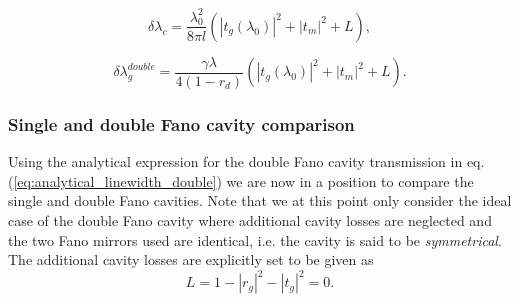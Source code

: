 \begin{equation}
    \delta \lambda_c = \frac{\lambda_0^2}{8 \pi l} (|t_g(\lambda_0)|^2 + |t_m|^2 + L),
\end{equation}

\begin{equation}
    \delta \lambda_g^{double} = \frac{\gamma \lambda}{4 (1-r_d)}(|t_g(\lambda_0)|^2 + |t_m|^2 + L).
    \label{eq:double_fano_linewidth_contribution}
\end{equation}

\subsubsection{Single and double Fano cavity comparison}

Using the analytical expression for the double Fano cavity transmission in eq. (\ref{eq:analytical_linewidth_double}) we are now in a position to compare the single and double Fano cavities. Note that we at this point only consider the ideal case of the double Fano cavity where additional cavity losses are neglected and the two Fano mirrors used are identical, i.e. the cavity is said to be \emph{symmetrical}. The additional cavity losses are explicitly set to be given as
\begin{equation}
    L = 1-|r_g|^2-|t_g|^2 = 0.
\end{equation}

